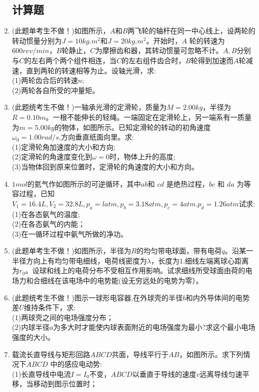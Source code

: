 \begin{enumerate}
\subsection{计算题}
\item (此题单考生不做！)如图所示，$A$和$B$两飞轮的轴杆在同一中心线上，设两轮的转动惯量分别为$J=10kg.m^2$和$J=20kg.m^2$。开始时，$A$ 轮的转速为 $600rev/min$，$B$轮静止，$C$为摩擦齿和器，其转动惯量可忽略不计。$A,B$分别与$C$的左右两个两个组件相连，当$C$的左右组件齿合时，$B$轮得到加速而$A$轮减速，直到两轮的转速相等为止。设轴光滑，求:\\
(1)两轮齿合后的转速$n$;\\
(2)两轮各自所受的冲量矩。
\item (此题统考生不做！)一轴承光滑的定滑轮，质量为$M=2.00kg$，半径为$ R=0.10m$。一根不能伸长的轻绳。一端固定在定滑轮上，另一端系有一质量为$m=5.00kg $的物体，如图所示。已知定滑轮的转动的初角速度 $\omega_0=1.00 rad/s$,方向垂直纸面向里。求:\\
(1)定滑轮角加速度的大小和方向;\\
(2)定滑轮的角速度变化到$\omega=0$时，物体上升的高度;\\
(3)当物体回到原来位置时，定滑轮的角速度的大小和方向。
\item $1 mol $的氦气作如图所示的可逆循环，其中$ ab $和 $cd$ 是绝热过程，$bc$ 和 $da$ 为等容过程，已知$V_1=16.4L,V_2=32.8L,p_a=l atm,p_b=3.18 atm,p_c=4 atm. p_d=1.26 atm $试求:\\
(1)在各态氨气的温度;\\
(2)在各态氨气的内能；\\
(3)在一循环过程中氨气所做的净功。
\item (此题单考生不做！)如图所示，半径为$R$的均匀带电球面，带有电荷$q$。沿某一半径方向上有均匀带电细线，电荷线密度为$\lambda$，长度为$1$.细线左端离球心距离为$r_0$。设球和线上的电荷分布不受相互作用影响。试求细线所受球面由荷的电场力和合细线在该电场中的电势能(设无穷远处的电势为零）。
\item (此题统考生不做！)图示一球形电容器,在外球壳的半径$b$和内外导体间的电势差$U$维持条件下，求:\\
(1)两球壳之间的电场强度分布；\\
(2)内球半径$a$为多大时才能使内球表面附近的电场强度为最小?求这个最小电场强度的大小。
\item 载流长直导线与矩形回路$ABCD$共面，导线平行于$ AB$，如图所示。求下列情况下$ABCD$ 中的感应电动势:\\
(1)长直导线中电流$I=I_0$不变，$ABCD $以垂直于导线的速度$v$远离导线匀速平移，当移动到图示位置时；\\

\end{enumerate}
